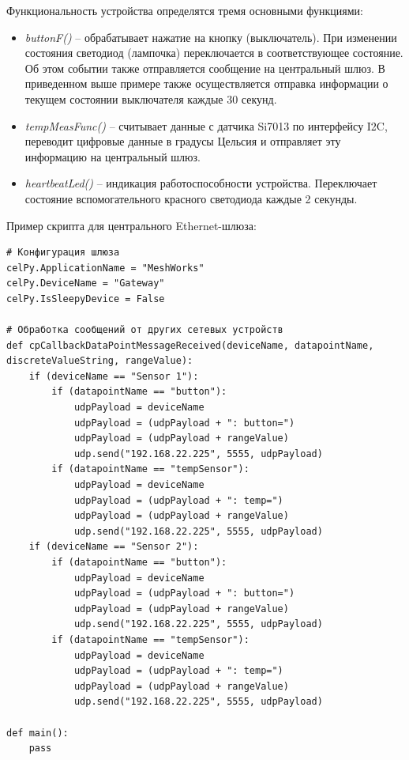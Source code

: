 \documentclass[12pt]{article}
\begin{document}
Функциональность устройства определятся тремя основными функциями:
\begin{itemize}
    \item \emph{buttonF()} -- обрабатывает нажатие на кнопку (выключатель). При 
    изменении состояния светодиод (лампочка) переключается в соответствующее состояние.
    Об этом событии также отправляется сообщение на центральный шлюз. В приведенном
    выше примере также осуществляется отправка информации о текущем состоянии выключателя
    каждые 30 секунд.
    \item \emph{tempMeasFunc()} -- считывает данные с датчика
    Si7013 по интерфейсу I2C, переводит цифровые данные в градусы Цельсия и 
    отправляет эту информацию на центральный шлюз.
    \item \emph{heartbeatLed()} -- индикация работоспособности устройства. Переключает
    состояние вспомогательного красного светодиода каждые 2 секунды.
\end{itemize}

Пример скрипта для центрального Ethernet-шлюза:
\begin{verbatim}
# Конфигурация шлюза
celPy.ApplicationName = "MeshWorks"
celPy.DeviceName = "Gateway"
celPy.IsSleepyDevice = False

# Обработка сообщений от других сетевых устройств
def cpCallbackDataPointMessageReceived(deviceName, datapointName, discreteValueString, rangeValue):
    if (deviceName == "Sensor 1"):
        if (datapointName == "button"):
            udpPayload = deviceName
            udpPayload = (udpPayload + ": button=")
            udpPayload = (udpPayload + rangeValue)
            udp.send("192.168.22.225", 5555, udpPayload)
        if (datapointName == "tempSensor"): 
            udpPayload = deviceName
            udpPayload = (udpPayload + ": temp=")
            udpPayload = (udpPayload + rangeValue)
            udp.send("192.168.22.225", 5555, udpPayload) 
    if (deviceName == "Sensor 2"):
        if (datapointName == "button"):
            udpPayload = deviceName
            udpPayload = (udpPayload + ": button=")
            udpPayload = (udpPayload + rangeValue)
            udp.send("192.168.22.225", 5555, udpPayload)
        if (datapointName == "tempSensor"): 
            udpPayload = deviceName
            udpPayload = (udpPayload + ": temp=") 
            udpPayload = (udpPayload + rangeValue)
            udp.send("192.168.22.225", 5555, udpPayload)  
   
def main(): 
    pass

\end{verbatim}
\end{document}
